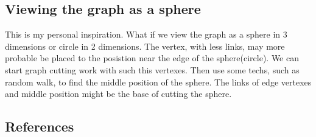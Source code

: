 \documentclass{article}
\begin{document}
	\subsection{Viewing the graph as a sphere}
	This is my personal inspiration. What if we view the graph as a sphere in 3 dimensions or circle in 2 dimensions. The vertex, with less links, may more probable be placed to the posistion near the edge of the sphere(circle). We can start graph cutting work with such this vertexes. Then use some techs, such as random walk, to find the middle position of the sphere. The links of edge vertexes and middle position might be the base of cutting the sphere.

	\newpage
	\begin{appendix}
		\section{References}
		
		
	\end{appendix}
\end{document}

